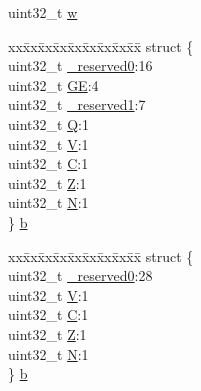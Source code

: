 \begin{DoxyCompactItemize}
\begin{tabbing}
\end{tabbing}\item 
uint32\+\_\+t \mbox{\hyperlink{union_a_p_s_r___type_ae4c2ef8c9430d7b7bef5cbfbbaed3a94}{w}}
\item 
\begin{tabbing}
xx\=xx\=xx\=xx\=xx\=xx\=xx\=xx\=xx\=\kill
struct \{\\
\>uint32\_t \mbox{\hyperlink{union_a_p_s_r___type_afbce95646fd514c10aa85ec0a33db728}{\_reserved0}}:16\\
\>uint32\_t \mbox{\hyperlink{union_a_p_s_r___type_adcb98a5b9c93b0cb69cdb7af5638f32e}{GE}}:4\\
\>uint32\_t \mbox{\hyperlink{union_a_p_s_r___type_ac681f266e20b3b3591b961e13633ae13}{\_reserved1}}:7\\
\>uint32\_t \mbox{\hyperlink{union_a_p_s_r___type_a22d10913489d24ab08bd83457daa88de}{Q}}:1\\
\>uint32\_t \mbox{\hyperlink{union_a_p_s_r___type_a8004d224aacb78ca37774c35f9156e7e}{V}}:1\\
\>uint32\_t \mbox{\hyperlink{union_a_p_s_r___type_a86e2c5b891ecef1ab55b1edac0da79a6}{C}}:1\\
\>uint32\_t \mbox{\hyperlink{union_a_p_s_r___type_a3b04d58738b66a28ff13f23d8b0ba7e5}{Z}}:1\\
\>uint32\_t \mbox{\hyperlink{union_a_p_s_r___type_a7e7bbba9b00b0bb3283dc07f1abe37e0}{N}}:1\\
\} \mbox{\hyperlink{union_a_p_s_r___type_a58bbe4a401dd92b53a0e9e2ab20486a9}{b}}\\

\end{tabbing}\item 
\begin{tabbing}
xx\=xx\=xx\=xx\=xx\=xx\=xx\=xx\=xx\=\kill
struct \{\\
\>uint32\_t \mbox{\hyperlink{union_a_p_s_r___type_afbce95646fd514c10aa85ec0a33db728}{\_reserved0}}:28\\
\>uint32\_t \mbox{\hyperlink{union_a_p_s_r___type_a8004d224aacb78ca37774c35f9156e7e}{V}}:1\\
\>uint32\_t \mbox{\hyperlink{union_a_p_s_r___type_a86e2c5b891ecef1ab55b1edac0da79a6}{C}}:1\\
\>uint32\_t \mbox{\hyperlink{union_a_p_s_r___type_a3b04d58738b66a28ff13f23d8b0ba7e5}{Z}}:1\\
\>uint32\_t \mbox{\hyperlink{union_a_p_s_r___type_a7e7bbba9b00b0bb3283dc07f1abe37e0}{N}}:1\\
\} \mbox{\hyperlink{union_a_p_s_r___type_a99c3ab089dde40ee2a043b340006df66}{b}}\\


\end{tabbing}
\end{DoxyCompactItemize}
